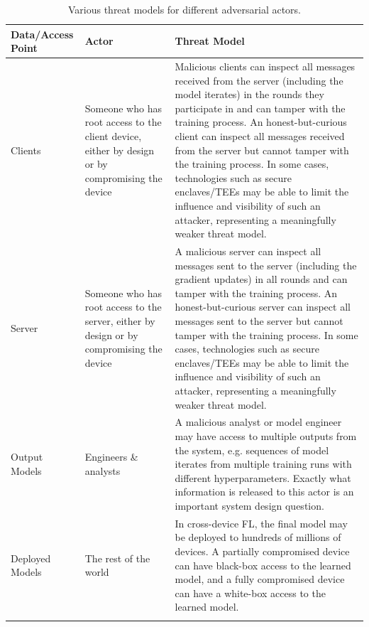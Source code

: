 \begin{table}
\renewcommand{\arraystretch}{1.2}
\begin{center} 
\begin{tabular}{@{}p{1.2in} p{1.85in}  p{3in}@{}}
\toprule
\textbf{Data/Access Point} & \textbf{Actor} & \textbf{Threat Model} \\
\midrule
\addlinespace[0.05in]
Clients & 
Someone who has root access to the client device, either by design or by compromising the device &
Malicious clients can inspect all messages received from the server (including the model iterates) in the rounds they participate in and can tamper with the training process.  An honest-but-curious client can inspect all messages received from the server but cannot tamper with the training process.   In some cases, technologies such as secure enclaves/TEEs may be able to limit the influence and visibility of such an attacker, representing a meaningfully weaker threat model.
\\ 
\addlinespace[0.1in]
Server & 
Someone who has root access to the server, either by design or by compromising the device &
A malicious server can inspect all messages sent to the server (including the gradient updates) in all rounds and can tamper with the training process. An honest-but-curious server can inspect all messages sent to the server but cannot tamper with the training process.  In some cases, technologies such as secure enclaves/TEEs may be able to limit the influence and visibility of such an attacker, representing a meaningfully weaker threat model.
\\ 
\addlinespace[0.1in]
Output Models &
Engineers \& analysts & 
A malicious analyst or model engineer may have access to multiple outputs from the system, e.g. sequences of model iterates from multiple training runs with different hyperparameters. Exactly what information is released to this actor is an important system design question. 
\\
\addlinespace[0.1in]
Deployed Models &
The rest of the world & 
In cross-device FL, the final model may be deployed to hundreds of millions of devices. A partially compromised device can have black-box access to the learned model, and a fully compromised device can have a white-box access to the learned model.
\\ 
\addlinespace[0.05in]
\bottomrule
\end{tabular} 
\end{center}
\caption{Various threat models for different adversarial actors.} 
\label{table:actors_and_threats}
 \end{table}

